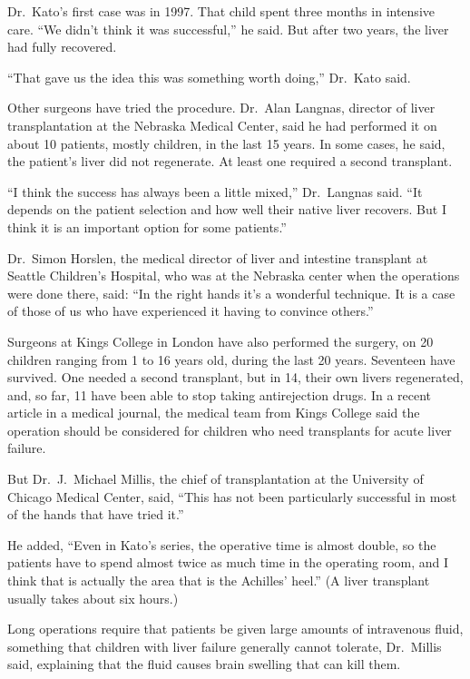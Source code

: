 ﻿\documentclass[12pt]{article}
\begin{document}
Dr.~Kato's first case was in 1997. That child spent three months in intensive care. ``We didn't
think it was successful,'' he said. But after two years, the liver had fully recovered.

``That gave us the idea this was something worth doing,'' Dr.~Kato said.

Other surgeons have tried the procedure. Dr.~Alan Langnas, director of liver transplantation at the
Nebraska Medical Center, said he had performed it on about 10 patients, mostly children, in the last
15 years. In some cases, he said, the patient's liver did not regenerate. At least one required a
second transplant.

``I think the success has always been a little mixed,'' Dr.~Langnas said. ``It depends on the
patient selection and how well their native liver recovers. But I think it is an important option
for some patients.''

Dr.~Simon Horslen, the medical director of liver and intestine transplant at Seattle Children's
Hospital, who was at the Nebraska center when the operations were done there, said: ``In the right
hands it's a wonderful technique. It is a case of those of us who have experienced it having to
convince others.''

Surgeons at Kings College in London have also performed the surgery, on 20 children ranging from 1
to 16 years old, during the last 20 years. Seventeen have survived. One needed a second transplant,
but in 14, their own livers regenerated, and, so far, 11 have been able to stop taking antirejection
drugs. In a recent article in a medical journal, the medical team from Kings College said the
operation should be considered for children who need transplants for acute liver failure.

But Dr.~J.~Michael Millis, the chief of transplantation at the University of Chicago Medical Center,
said, ``This has not been particularly successful in most of the hands that have tried it.''

He added, ``Even in Kato's series, the operative time is almost double, so the patients have to
spend almost twice as much time in the operating room, and I think that is actually the area that is
the Achilles' heel.'' (A liver transplant usually takes about six hours.)

Long operations require that patients be given large amounts of intravenous fluid, something that
children with liver failure generally cannot tolerate, Dr.~Millis said, explaining that the fluid
causes brain swelling that can kill them.
\end{document}
